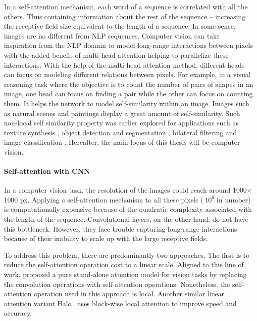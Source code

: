 In a self-attention mechanism, each word of a sequence is correlated with all the others. Thus containing information about the rest of the sequence -- increasing the receptive field size equivalent to the length of a sequence. In some sense, images are no different from NLP sequences. Computer vision can take inspiration from the NLP domain to model long-range interactions between pixels with the added benefit of multi-head attention helping to parallelize these interactions. With the help of the multi-head attention method, different heads can focus on modeling different relations between pixels. For example, in a visual reasoning task where the objective is to count the number of pairs of shapes in an image, one head can focus on finding a pair while the other can focus on counting them. It helps the network to model self-similarity within an image. Images such as natural scenes and paintings display a great amount of self-similarity. Such non-local self similarity property was earlier explored for applications such as texture synthesis \citep{efros1999texture}, object detection and segmentation \citep{Wang_2018_CVPR}, bilateral filtering \citep{tomasi1998bilateral} and image classification \citep{pmlr-v80-parmar18a}. Hereafter, the main focus of this thesis will be computer vision.  

\paragraph{Self-attention with CNN}

In a computer vision task, the resolution of the images could reach around 1000$\times$1000 px. Applying a self-attention mechanism to all these pixels ($~10^6$ in number) is computationally expensive because of the quadratic complexity associated with the length of the sequence. Convolutional layers, on the other hand, do not have this bottleneck. However, they face trouble capturing long-range interactions because of their inability to scale up with the large receptive fields. 

To address this problem, there are predominantly two approaches. The first is to reduce the self-attention operation cost to a linear scale. Aligned to this line of work, \citet{ramachandran2019stand} proposed a pure stand-alone attention model for vision tasks by replacing the convolution operations with self-attention operations. Nonetheless, the self-attention operation used in this approach is local. Another similar linear attention variant Halo~\citep{vaswani2021scaling} uses block-wise local attention to improve speed and accuracy. 

